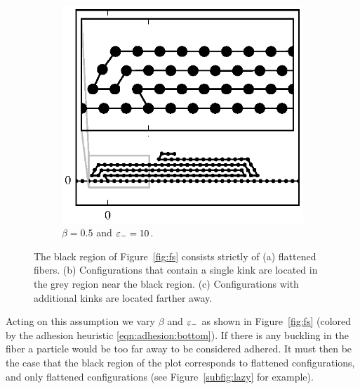 \begin{figure}[h!]
		\begin{subfigure}{.5\textwidth}
			\centering
			\includegraphics{./fig/ch3/fs/b0.5_eb10.eps}
			\caption{$\beta=0.5$ and $\varepsilon_-=10$.\label{subfig:lazy_many_loops}}
		\end{subfigure}		
		\caption{The black region of Figure~\ref{fig:fs} consists strictly of (a) flattened fibers. (b) Configurations that contain a single kink are located in the grey region near the black region. (c) Configurations with additional kinks are located farther away.\label{fig:lazy}}	
	\end{figure}

Acting on this assumption we vary $\beta$ and $\varepsilon_-$ as shown in Figure~\ref{fig:fs} (colored by the adhesion heuristic \ref{eqn:adhesion:bottom}). If there is any buckling in the fiber a particle would be too far away to be considered adhered. It must then be the case that the black region of the plot corresponds to flattened configurations, and only flattened configurations (see Figure~\ref{subfig:lazy} for example). 

